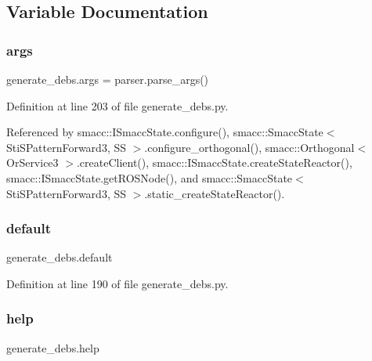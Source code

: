 \subsection{Variable Documentation}
\mbox{\label{namespacegenerate__debs_a75f9143e38df82d83b2e8a6f99cae02c}} 
\subsubsection{\texorpdfstring{args}{args}}
{\footnotesize\ttfamily generate\+\_\+debs.\+args = parser.\+parse\+\_\+args()}



Definition at line 203 of file generate\+\_\+debs.\+py.



Referenced by smacc\+::\+I\+Smacc\+State.\+configure(), smacc\+::\+Smacc\+State$<$ Sti\+S\+Pattern\+Forward3, S\+S $>$.\+configure\+\_\+orthogonal(), smacc\+::\+Orthogonal$<$ Or\+Service3 $>$.\+create\+Client(), smacc\+::\+I\+Smacc\+State.\+create\+State\+Reactor(), smacc\+::\+I\+Smacc\+State.\+get\+R\+O\+S\+Node(), and smacc\+::\+Smacc\+State$<$ Sti\+S\+Pattern\+Forward3, S\+S $>$.\+static\+\_\+create\+State\+Reactor().

\mbox{\label{namespacegenerate__debs_a3d67a92b7eb3a59c397dc9fdd1c67558}} 
\subsubsection{\texorpdfstring{default}{default}}
{\footnotesize\ttfamily generate\+\_\+debs.\+default}



Definition at line 190 of file generate\+\_\+debs.\+py.

\mbox{\label{namespacegenerate__debs_ab09f4294da5036d5f6881672de9ed9c7}} 
\subsubsection{\texorpdfstring{help}{help}}
{\footnotesize\ttfamily generate\+\_\+debs.\+help}



